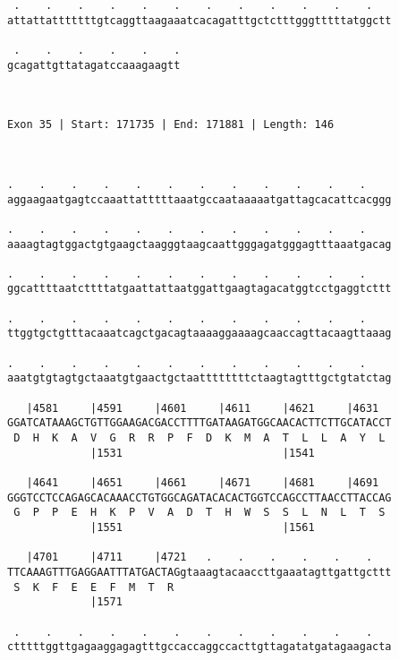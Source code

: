 \documentclass{article}
\begin{document}
\begin{Verbatim}
 .    .    .    .    .    .    .    .    .    .    .    .   
attattatttttttgtcaggttaagaaatcacagatttgctctttgggtttttatggctt
                                                            
 .    .    .    .    .    .
gcagattgttatagatccaaagaagtt
                           
                           
 
Exon 35 | Start: 171735 | End: 171881 | Length: 146



.    .    .    .    .    .    .    .    .    .    .    .    
aggaagaatgagtccaaattatttttaaatgccaataaaaatgattagcacattcacggg
                                                            
.    .    .    .    .    .    .    .    .    .    .    .    
aaaagtagtggactgtgaagctaagggtaagcaattgggagatgggagtttaaatgacag
                                                            
.    .    .    .    .    .    .    .    .    .    .    .    
ggcattttaatcttttatgaattattaatggattgaagtagacatggtcctgaggtcttt
                                                            
.    .    .    .    .    .    .    .    .    .    .    .    
ttggtgctgtttacaaatcagctgacagtaaaaggaaaagcaaccagttacaagttaaag
                                                            
.    .    .    .    .    .    .    .    .    .    .    .    
aaatgtgtagtgctaaatgtgaactgctaattttttttctaagtagtttgctgtatctag
                                                            
   |4581     |4591     |4601     |4611     |4621     |4631  
GGATCATAAAGCTGTTGGAAGACGACCTTTTGATAAGATGGCAACACTTCTTGCATACCT
 D  H  K  A  V  G  R  R  P  F  D  K  M  A  T  L  L  A  Y  L 
             |1531                         |1541            
  
   |4641     |4651     |4661     |4671     |4681     |4691  
GGGTCCTCCAGAGCACAAACCTGTGGCAGATACACACTGGTCCAGCCTTAACCTTACCAG
 G  P  P  E  H  K  P  V  A  D  T  H  W  S  S  L  N  L  T  S 
             |1551                         |1561            
  
   |4701     |4711     |4721   .    .    .    .    .    .   
TTCAAAGTTTGAGGAATTTATGACTAGgtaaagtacaaccttgaaatagttgattgcttt
 S  K  F  E  E  F  M  T  R                                  
             |1571                                          
  
 .    .    .    .    .    .    .    .    .    .    .    .   
ctttttggttgagaaggagagtttgccaccaggccacttgttagatatgatagaagacta
                                                            

\end{Verbatim}
\end{document}
